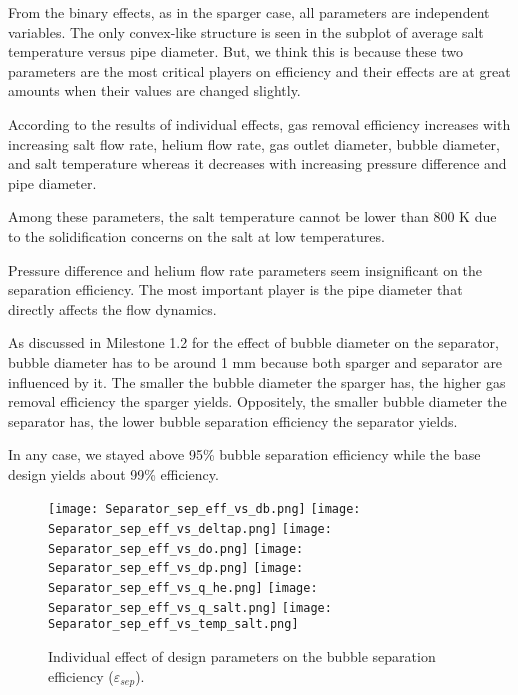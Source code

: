     From the binary effects, as in the sparger case, all parameters are 
    independent variables. The only convex-like structure is seen in the 
    subplot of average salt temperature versus pipe diameter. But, we think 
    this is because these two parameters are the most critical players on 
    efficiency and their effects are at great amounts when their values are 
    changed slightly.

    According to the results of individual effects, gas removal efficiency 
    increases with increasing salt flow rate, helium flow rate, gas outlet 
    diameter, bubble diameter, and salt temperature whereas it decreases with 
    increasing pressure difference and pipe diameter.

    Among these parameters, the salt temperature cannot be lower than 800 K due 
    to the solidification concerns on the salt at low temperatures.

    Pressure difference and helium flow rate parameters seem insignificant on 
    the separation efficiency. The most important player is the pipe diameter 
    that directly affects the flow dynamics.

    As discussed in Milestone 1.2 for the effect of bubble diameter on the 
    separator, bubble diameter has to be around 1 mm because both sparger and 
    separator are influenced by it. The smaller the bubble diameter the sparger 
    has, the higher gas removal efficiency the sparger yields. Oppositely, the 
    smaller bubble diameter the separator has, the lower bubble separation 
    efficiency the separator yields.

    In any case, we stayed above 95\% bubble separation efficiency while the 
    base design yields about 99\% efficiency.

\begin{figure}[htbp!]
    \begin{center}
        \texttt{[image: Separator\_sep\_eff\_vs\_db.png]}
        \texttt{[image: Separator\_sep\_eff\_vs\_deltap.png]}
        \texttt{[image: Separator\_sep\_eff\_vs\_do.png]}
        \texttt{[image: Separator\_sep\_eff\_vs\_dp.png]}
        \texttt{[image: Separator\_sep\_eff\_vs\_q\_he.png]}
        \texttt{[image: Separator\_sep\_eff\_vs\_q\_salt.png]}
        \texttt{[image: Separator\_sep\_eff\_vs\_temp\_salt.png]}
    \end{center}
    \caption{Individual effect of design parameters on the bubble separation 
        efficiency ($\varepsilon$$_{sep}$).}
    \label{fig:individual_eff_separator}
\end{figure}

